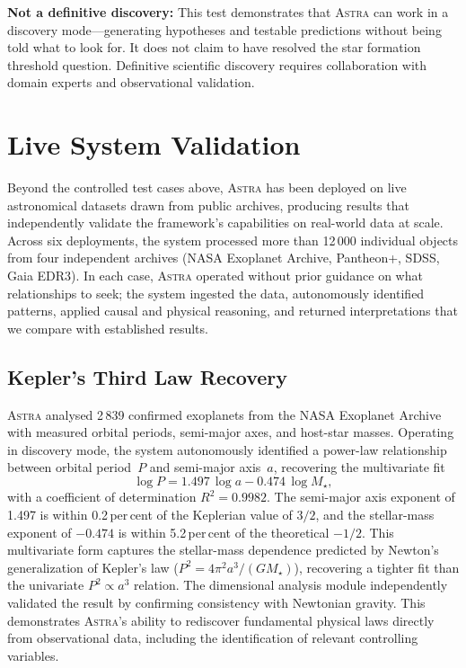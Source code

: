 \documentclass[usenatbib]{rasti}
\newcommand{\astra}{\textsc{Astra}\xspace}
\begin{document}
\textbf{Not a definitive discovery:}
This test demonstrates that \astra can work in a discovery mode---generating hypotheses and testable predictions without being told what to look for.
It does not claim to have resolved the star formation threshold question.
Definitive scientific discovery requires collaboration with domain experts and observational validation.

\section{Live System Validation}
\label{sec:live}

Beyond the controlled test cases above, \astra has been deployed on live astronomical datasets drawn from public archives, producing results that independently validate the framework's capabilities on real-world data at scale.
Across six deployments, the system processed more than 12\,000 individual objects from four independent archives (NASA Exoplanet Archive, Pantheon+, SDSS, Gaia EDR3).
In each case, \astra operated without prior guidance on what relationships to seek; the system ingested the data, autonomously identified patterns, applied causal and physical reasoning, and returned interpretations that we compare with established results.

\subsection{Kepler's Third Law Recovery}
\label{sec:live:kepler}

\astra analysed 2\,839 confirmed exoplanets from the NASA Exoplanet Archive with measured orbital periods, semi-major axes, and host-star masses.
Operating in discovery mode, the system autonomously identified a power-law relationship between orbital period~$P$ and semi-major axis~$a$, recovering the multivariate fit
\begin{equation}
  \log P = 1.497\,\log a - 0.474\,\log M_{\star},
  \label{eq:kepler}
\end{equation}
with a coefficient of determination $R^{2} = 0.9982$.
The semi-major axis exponent of 1.497 is within 0.2\,per\,cent of the Keplerian value of $3/2$, and the stellar-mass exponent of $-0.474$ is within 5.2\,per\,cent of the theoretical $-1/2$.
This multivariate form captures the stellar-mass dependence predicted by Newton's generalization of Kepler's law ($P^{2} = 4\pi^{2} a^{3}/(GM_{\star})$), recovering a tighter fit than the univariate $P^{2} \propto a^{3}$ relation.
The dimensional analysis module independently validated the result by confirming consistency with Newtonian gravity.
This demonstrates \astra's ability to rediscover fundamental physical laws directly from observational data, including the identification of relevant controlling variables.
\end{document}
